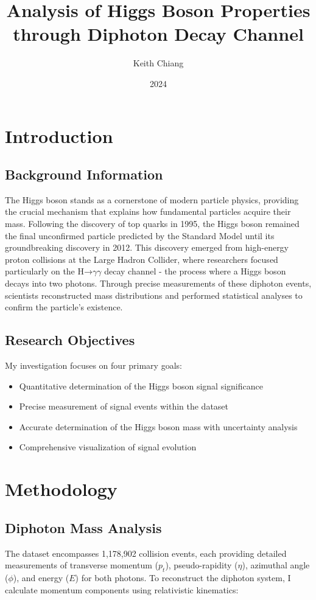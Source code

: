 \documentclass{article}
\title{Analysis of Higgs Boson Properties through Diphoton Decay Channel}
\author{Keith Chiang}
\date{2024}
\begin{document}
\maketitle

\section{Introduction}
\subsection{Background Information}
The Higgs boson stands as a cornerstone of modern particle physics, providing the crucial mechanism that explains how fundamental particles acquire their mass. Following the discovery of top quarks in 1995, the Higgs boson remained the final unconfirmed particle predicted by the Standard Model until its groundbreaking discovery in 2012. This discovery emerged from high-energy proton collisions at the Large Hadron Collider, where researchers focused particularly on the H→\(\gamma\gamma\) decay channel - the process where a Higgs boson decays into two photons. Through precise measurements of these diphoton events, scientists reconstructed mass distributions and performed statistical analyses to confirm the particle's existence.

\subsection{Research Objectives}
My investigation focuses on four primary goals:
\begin{itemize}
    \item Quantitative determination of the Higgs boson signal significance
    \item Precise measurement of signal events within the dataset
    \item Accurate determination of the Higgs boson mass with uncertainty analysis
    \item Comprehensive visualization of signal evolution
\end{itemize}

\section{Methodology}
\subsection{Diphoton Mass Analysis}
The dataset encompasses 1,178,902 collision events, each providing detailed measurements of transverse momentum (\(p_t\)), pseudo-rapidity (\(\eta\)), azimuthal angle (\(\phi\)), and energy (\(E\)) for both photons. To reconstruct the diphoton system, I calculate momentum components using relativistic kinematics:
\end{document}
